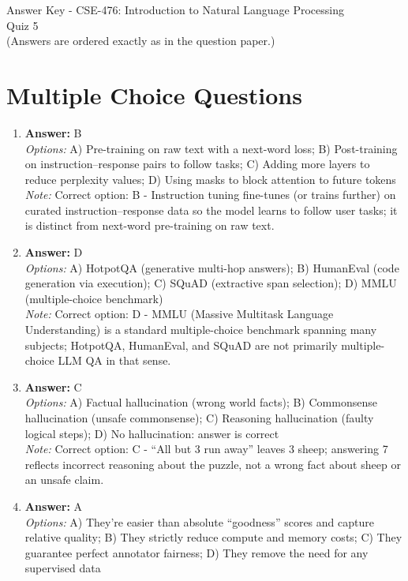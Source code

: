 \documentclass[12pt]{article}
\begin{document}
\begin{center}
Answer Key - CSE-476: Introduction to Natural Language Processing \\
Quiz 5 \\
\small (Answers are ordered exactly as in the question paper.)
\end{center}

\section*{Multiple Choice Questions}
\begin{enumerate}[label=Q\arabic*.]
\item \textbf{Answer:} B
\\ \textit{Options:} A) Pre-training on raw text with a next-word loss; B) Post-training on instruction--response pairs to follow tasks; C) Adding more layers to reduce perplexity values; D) Using masks to block attention to future tokens
\\ \textit{Note:} Correct option: B - Instruction tuning fine-tunes (or trains further) on curated instruction--response data so the model learns to follow user tasks; it is distinct from next-word pre-training on raw text.
\item \textbf{Answer:} D
\\ \textit{Options:} A) HotpotQA (generative multi-hop answers); B) HumanEval (code generation via execution); C) SQuAD (extractive span selection); D) MMLU (multiple-choice benchmark)
\\ \textit{Note:} Correct option: D - MMLU (Massive Multitask Language Understanding) is a standard multiple-choice benchmark spanning many subjects; HotpotQA, HumanEval, and SQuAD are not primarily multiple-choice LLM QA in that sense.
\item \textbf{Answer:} C
\\ \textit{Options:} A) Factual hallucination (wrong world facts); B) Commonsense hallucination (unsafe commonsense); C) Reasoning hallucination (faulty logical steps); D) No hallucination: answer is correct
\\ \textit{Note:} Correct option: C - ``All but 3 run away'' leaves 3 sheep; answering 7 reflects incorrect reasoning about the puzzle, not a wrong fact about sheep or an unsafe claim.
\item \textbf{Answer:} A
\\ \textit{Options:} A) They're easier than absolute ``goodness'' scores and capture relative quality; B) They strictly reduce compute and memory costs; C) They guarantee perfect annotator fairness; D) They remove the need for any supervised data

\end{enumerate}
\end{document}
